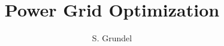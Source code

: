 \documentclass[colorlinks]{article}
\begin{document}
%
\title{Power Grid Optimization}
\author{S. Grundel}
\maketitle

%
\end{document}
